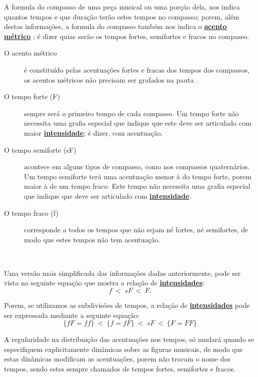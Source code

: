 A formula do compasso de uma peça musical ou uma porção dela, 
nos indica quantos tempos e que duração terão estes tempos no compasso; 
porem, além destas informações, 
a formula do compasso também nos indica o \hyperref[def:acentometrico]{\textbf{acento métrico}} \cite[pp. 70]{cardoso1973curso}; 
é dizer quias serão os tempos fortes, semifortes e fracos no compasso.


\begin{description}
\item[O acento métrico] \label{def:acentometrico} é constituído pelas acentuações fortes e fracas dos tempos dos compassos, 
os acentos métricos não precisam ser grafados na pauta \cite[pp. 141]{medteoria}.
\item[O tempo forte (F)] \label{def:tempoforte} sempre será o primeiro tempo de cada compasso. 
Um tempo forte não necessita uma grafia especial que indique que este deve ser articulado
com maior \hyperref[sec:pos:Intensidade]{\textbf{intensidade}}; é dizer, com acentuação.
\item[O tempo semiforte (sF)] \label{def:temposemiforte} acontece em alguns tipos de compasso, 
como nos compassos quaternários. 
Um tempo semiforte terá uma acentuação menor à do tempo forte, porem maior à de um tempo fraco. 
Este tempo não necessita uma grafia especial que indique que deve ser articulado
com \hyperref[sec:pos:Intensidade]{\textbf{intensidade}}.
\item[O tempo fraco (f)] \label{def:tempofraco} corresponde a todos os tempos que não sejam né fortes, né semifortes,
de modo que estes tempos não tem acentuação. 
\end{description}~

Uma versão mais simplificada das informações dadas anteriormente, 
pode ser vista na seguinte equação que mostra a relação de \hyperref[sec:pos:Intensidade]{\textbf{intensidades}}:
\begin{equation}
f ~<~ sF ~<~ F.
\end{equation}

Porem, 
se utilizamos as subdivisões de tempos, 
a relação de \hyperref[sec:pos:Intensidade]{\textbf{intensidades}} pode ser expressada mediante a seguinte equação:
\begin{equation}
\{fF=ff\} ~<~  \{f = fF\} ~<~ sF ~<~ \{F = FF\} 
\end{equation}

\begin{tcbattention}
A regularidade na distribuição das acentuações nos tempos, 
só mudará quando se especifiquem  explicitamente dinâmicas sobre as figuras musicais,
de modo que estas dinâmicas modificam as acentuações,
porem não trocam o nome dos tempos, sendo estes sempre chamados de tempos fortes, semifortes e fracos. 
\end{tcbattention}


